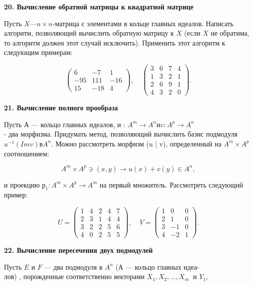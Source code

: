 {\noindent\bf20. Вычисление обратной матрицы к квадратной матрице} 


Пусть $X — n \times n$-матрица с элементами в кольце главных идеалов. 
Написать алгоритм, позволяющий вычислить обратную матрицу к $X$ 
(если $X$ не обратима, то алгоритм должен этот случай исключить). 
Применить этот алгоритм к следующим примерам: 


$$\begin{pmatrix}
6 & -7 & 1 \\
-95 & 111 & -16 \\
15 & -18 & 4 
\end{pmatrix},\;\;\;\;
\begin{pmatrix}
3 & 6 & 7 & 4 \\
1 & 3 & 2 & 1\\
2 & 6 & 9 & 1\\
4 & 3 & 2 & 0
\end{pmatrix}.$$


{\noindent\bf21. Вычисление полного прообраза}


Пусть А — кольцо главных идеалов, и : $A^m \longrightarrow A^n \text{и} \upsilon : A^p \longrightarrow A^n 
$\\- два морфизма. Придумать метод, позволяющий вычислить базис 
подмодуля $u^{-1}(Im \upsilon) \text{в} A^n$. Можно рассмотреть морфизм (u | v), 
определенный на $A^m \times A^p$ соотношением:


$$ A^m \times A^p \ni (x,y)\to u(x) + v(y)\in A^n, $$


и проекцию $ р_1 : A^m \times A^p \rightarrow A^m $ на первый множитель. Рассмотреть 
следующий пример: 


$$U=\begin{pmatrix}
1 & 4 & 2 & 4 & 7 \\
2 & 3 & 1 & 4 & 4\\
3 & 2 & 2 & 5 & 6\\
4 & 0 & 2 & 5 & 5
\end{pmatrix},\;\;\;\;
V=\begin{pmatrix}
1 & 0 & 0  \\
2 & 1 & 0 \\
3 & -1 & 0 \\
4 & -2 & 1 
\end{pmatrix}.$$ 


{\noindent\bf22. Вычисление пересечения двух подмодулей }


Пусть $E$ и $F$ — два подмодуля в $A^n$ ($А$ — кольцо главных 
идеа-\\лов) , порожденные соответственно векторами $ X_1,X_2,...,X_m\;\;\text{и }Y_1 $,


